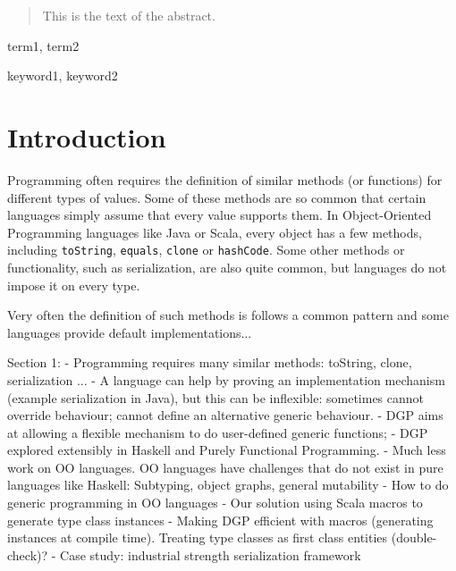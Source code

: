 \documentclass[preprint]{sigplanconf}
\begin{document}
\maketitle

\begin{abstract}
This is the text of the abstract.
\end{abstract}


\terms
term1, term2

\keywords
keyword1, keyword2

\section{Introduction}

Programming often requires the definition of similar methods (or
functions) for different types of values. Some of these methods are so
common that certain languages simply assume that every value supports
them. In Object-Oriented Programming languages like Java or Scala,
every object has a few methods, including \lstinline{toString},
\lstinline{equals}, \lstinline{clone} or \lstinline{hashCode}.  Some
other methods or functionality, such as serialization, are also quite
common, but languages do not impose it on every type.


Very often the definition of such methods is follows a common
pattern and some languages provide default implementations...

Section 1:
   - Programming requires many similar methods: toString, clone,
      serialization ...
   - A language can help by proving an implementation mechanism
     (example serialization in Java), but this can be inflexible:
     sometimes cannot override behaviour; cannot define an alternative
     generic behaviour.
   - DGP aims at allowing a flexible mechanism to do user-defined
   generic functions;
   - DGP explored extensibly in Haskell and Purely Functional
   Programming.
   - Much less work on OO languages. OO languages have challenges
    that do not exist in pure languages like Haskell: Subtyping,
    object graphs, general mutability
   - How to do generic programming in OO languages
   - Our solution using Scala macros to generate type class instances
   - Making DGP efficient with macros (generating instances at compile
   time). Treating type classes as first class entities
   (double-check)?
   - Case study: industrial strength serialization framework
\end{document}
